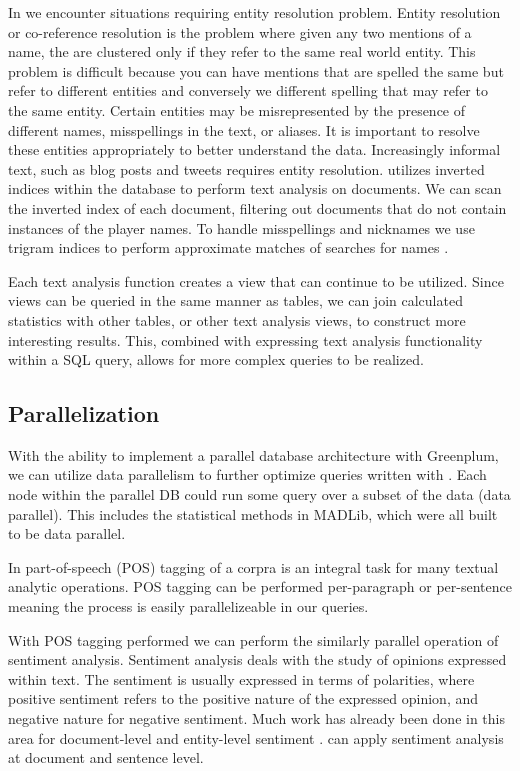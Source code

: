 In {\system} we encounter situations requiring entity resolution problem.
Entity resolution or co-reference resolution is the problem where given any two
mentions of a name, the are clustered only if they refer to the same real 
world entity. This problem is difficult because you can have mentions that are
spelled the same but refer to different entities and conversely we different
spelling that may refer to the same entity.
Certain entities may be misrepresented by the presence of different names, 
misspellings in the text, or aliases. It is important to
resolve these entities appropriately to better understand the data. Increasingly
informal text, such as blog posts and tweets requires entity resolution. 
{\system} utilizes inverted indices within the database to perform text
analysis on documents. We can scan the inverted index of each 
document, filtering out documents that do not contain instances of the player names.
To handle misspellings and nicknames we use trigram indices to perform 
approximate matches of searches for names \cite{Jain:2009:BQO:1519103.1519108}.

Each text analysis function creates a view that can continue to be utilized.
Since views can be queried in the same manner as tables, we can join calculated
statistics with other tables, or other text analysis views, to construct more
interesting results. This, combined with expressing text analysis functionality
within a SQL query, allows for more complex queries to be realized. \\



\subsection{Parallelization}
With the ability to implement a parallel database architecture with %
Greenplum, we can utilize data parallelism to further optimize queries written
with {\system}. Each node within the parallel DB could run some query
over a subset of the data (data parallel). This includes the statistical methods
in MADLib, which were all built to be data parallel.

In part-of-speech (POS) tagging of a corpra is an integral task for many 
textual analytic operations. POS tagging can be performed per-paragraph or 
per-sentence meaning the process is easily parallelizeable in our queries.

With POS tagging performed we can perform the similarly parallel operation 
of sentiment analysis.
Sentiment analysis deals with the study of opinions expressed within text. 
The sentiment is usually expressed in terms of polarities, where positive
sentiment refers to the positive nature of the expressed opinion, and negative
nature for negative sentiment. Much work has already been done in this
area for document-level and entity-level sentiment \cite{o2010tweets,
zhang2011combining}. 
{\system} can apply sentiment analysis at document and sentence level.


